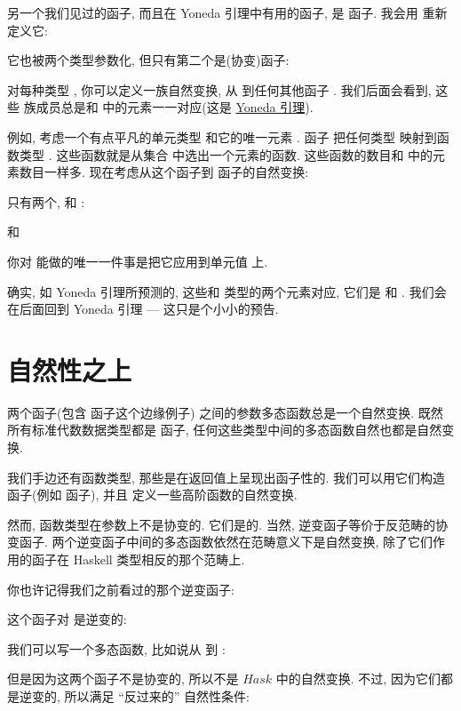 另一个我们见过的函子, 而且在 Yoneda 引理中有用的函子, 是  函子. 我会用  重新定义它:

它也被两个类型参数化, 但只有第二个是(协变)函子:

对每种类型 , 你可以定义一族自然变换, 从  到任何其他函子 . 我们后面会看到, 这些
族成员总是和  中的元素一一对应(这是 \hyperref[the-yoneda-lemma]{Yoneda 引理}).

例如, 考虑一个有点平凡的单元类型 \code{()} 和它的唯一元素 \code{()}. 函子  把任何类型
 映射到函数类型 . 这些函数就是从集合  中选出一个元素的函数. 这些函数的数目和
 中的元素数目一样多. 现在考虑从这个函子到  函子的自然变换:

只有两个,  和 :

和

你对  能做的唯一一件事是把它应用到单元值 \code{()} 上.

确实, 如 Yoneda 引理所预测的, 这些和  类型的两个元素对应, 它们是  和
. 我们会在后面回到 Yoneda 引理 --- 这只是个小小的预告.

\section{自然性之上}

两个函子(包含  函子这个边缘例子) 之间的参数多态函数总是一个自然变换. 既然所有标准代数数据类型都是
函子, 任何这些类型中间的多态函数自然也都是自然变换.

我们手边还有函数类型, 那些是在返回值上呈现出函子性的. 我们可以用它们构造函子(例如  函子), 并且
定义一些高阶函数的自然变换.

然而, 函数类型在参数上不是协变的. 它们是的. 当然, 逆变函子等价于反范畴的协变函子.
两个逆变函子中间的多态函数依然在范畴意义下是自然变换, 除了它们作用的函子在 Haskell 类型相反的那个范畴上.

你也许记得我们之前看过的那个逆变函子:

这个函子对  是逆变的:

我们可以写一个多态函数, 比如说从  到 :

但是因为这两个函子不是协变的, 所以不是 $Hask$ 中的自然变换. 不过, 因为它们都是逆变的, 所以满足 ``反过来的''
自然性条件:

